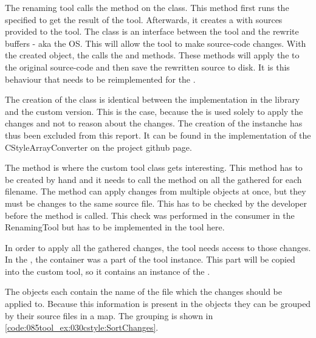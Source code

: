 The renaming tool calls the  method on the  class. This method first runs the specified  to get the result of the tool. Afterwards, it creates a  with sources provided to the tool. The  class is an interface between the tool and the rewrite buffers - aka the OS. This  will allow the tool to make source-code changes. With the created  object, the  calls the  and  methods. These methods will apply the  to the original source-code and then save the rewritten source to disk. It is this behaviour that needs to be reimplemented for the .

The creation of the  class is identical between the implementation in the library and the custom version. This is the case, because the  is used solely to apply the changes and not to reason about the changes. The creation of the  instanche has thus been excluded from this report. It can be found in the implementation of the CStyleArrayConverter on the project github page. 

The  method is where the custom tool class gets interesting. This method has to be created by hand and it needs to call the  method on all the gathered  for each filename. The  method can apply changes from multiple  objects at once, but they must be changes to the same source file. This has to be checked by the developer before the method is called. This check was performed in the consumer in the RenamingTool but has to be implemented in the tool here. 

In order to apply all the gathered changes, the tool needs access to those changes. In the , the  container was a part of the tool instance. This part will be copied into the custom tool, so it contains an instance of the . 

The  objects each contain the name of the file which the changes should be applied to. Because this information is present in the objects they can be grouped by their source files in a map. The grouping is shown in \cref{code:085tool_ex:030cstyle:SortChanges}.


